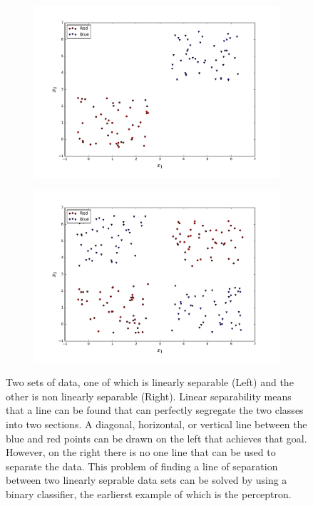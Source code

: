 \begin{figure}[!h]
  \centering
  \begin{subfigure}{.49\textwidth}
    \centering
    \includegraphics[width=\linewidth]{figures/twoClasses_separable.pdf}
  \end{subfigure} %
  \begin{subfigure}{0.49\textwidth}
    \centering
    \includegraphics[width=\linewidth]{figures/twoClasses_non_separable.pdf}
  \end{subfigure}
  \caption{Two sets of data, one of which is linearly separable (Left) and the other is non linearly separable (Right). Linear separability means that a line can be found that can perfectly segregate the two classes into two sections. A diagonal, horizontal, or vertical line between the blue and red points can be drawn on the left that achieves that goal. However, on the right there is no one line that can be used to separate the data. This problem of finding a line of separation between two linearly seprable data sets can be solved by using a binary classifier, the earlierst example of which is the perceptron.}
  \label{fig:two_classes_example}
\end{figure}


